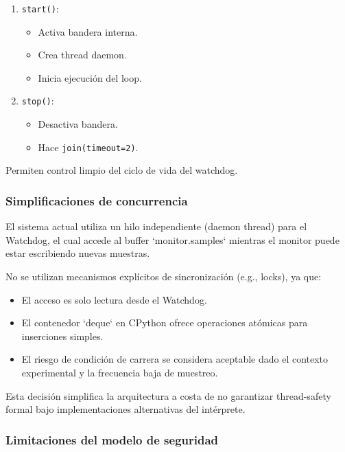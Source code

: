 \documentclass{article}
\begin{document}
\begin{enumerate}
\begin{enumerate}
\item \texttt{start()}:
    \begin{itemize}
        \item Activa bandera interna.
        \item Crea thread daemon.
        \item Inicia ejecución del loop.
    \end{itemize}

\item \texttt{stop()}:
    \begin{itemize}
        \item Desactiva bandera.
        \item Hace \texttt{join(timeout=2)}.
    \end{itemize}

\end{enumerate}

Permiten control limpio del ciclo de vida del watchdog.

\end{enumerate}

\subsubsection{Simplificaciones de concurrencia}

El sistema actual utiliza un hilo independiente (daemon thread) para el
Watchdog, el cual accede al buffer `monitor.samples` mientras el monitor
puede estar escribiendo nuevas muestras.

No se utilizan mecanismos explícitos de sincronización (e.g., locks),
ya que:

\begin{itemize}
    \item El acceso es solo lectura desde el Watchdog.
    \item El contenedor `deque` en CPython ofrece operaciones atómicas
    para inserciones simples.
    \item El riesgo de condición de carrera se considera aceptable
    dado el contexto experimental y la frecuencia baja de muestreo.
\end{itemize}

Esta decisión simplifica la arquitectura a costa de no garantizar
thread-safety formal bajo implementaciones alternativas del intérprete.

\subsubsection{Limitaciones del modelo de seguridad}
\end{document}
